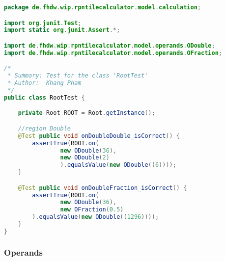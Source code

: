 \begin{lstlisting}[caption=RootTest (Pham),label=list:RootTest,language=Java]
package de.fhdw.wip.rpntilecalculator.model.calculation;

import org.junit.Test;
import static org.junit.Assert.*;

import de.fhdw.wip.rpntilecalculator.model.operands.ODouble;
import de.fhdw.wip.rpntilecalculator.model.operands.OFraction;

/*
 * Summary: Test for the class 'RootTest'
 * Author:  Khang Pham
 */
public class RootTest {

    private Root ROOT = Root.getInstance();

    //region Double
    @Test public void onDoubleDouble_isCorrect() {
        assertTrue(ROOT.on(
                new ODouble(36),
                new ODouble(2)
                ).equalsValue(new ODouble((6))));
    }

    @Test public void onDoubleFraction_isCorrect() {
        assertTrue(ROOT.on(
                new ODouble(36),
                new OFraction(0.5)
        ).equalsValue(new ODouble((1296))));
    }
}
\end{lstlisting}

\subsubsection{Operands}

